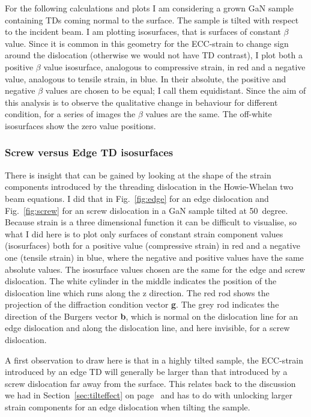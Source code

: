 For the following calculations and plots I am considering a \hkl[001] grown GaN sample containing TDs coming normal to the surface. The sample is tilted with respect to the incident beam. I am plotting isosurfaces, that is surfaces of constant $\beta$ value. Since it is common in this geometry for the ECC-strain to change sign around the dislocation (otherwise we would not have TD contrast), I plot both a positive $\beta$ value isosurface, analogous to compressive strain, in red and a negative value, analogous to tensile strain, in blue. In their absolute, the positive and negative $\beta$ values are chosen to be equal; I call them equidistant. Since the aim of this analysis is to observe the qualitative change in behaviour for different condition, for a series of images the $\beta$ values are the same. The off-white isosurfaces show the zero value positions. 


\subsubsection{Screw versus Edge TD isosurfaces}

There is insight that can be gained by looking at the shape of the strain components introduced by the threading dislocation in the Howie-Whelan two beam equations. I did that in Fig.~\ref{fig:edge} for an edge dislocation and   Fig.~\ref{fig:screw} for an screw dislocation in a GaN sample tilted at \SI{50}{degree}. Because strain is a three dimensional function it can be difficult to visualise, so what I did here is to plot only surfaces of constant strain component values (isosurfaces) both for a positive value (compressive strain) in red and a negative one (tensile strain) in blue, where the negative and positive values have the same absolute values. The isosurface values chosen are the same for the edge and screw dislocation.  The white cylinder in the middle indicates the position of the dislocation line which runs along the z direction. The red rod shows the projection of the diffraction condition vector \textbf{g}. The grey rod indicates the direction of the Burgers vector \textbf{b}, which is normal on the dislocation line for an edge dislocation and along the dislocation line, and here invisible, for a screw dislocation. 


A first observation to draw here is that in a highly tilted sample, the ECC-strain introduced by an edge TD will generally be larger than that introduced by a screw dislocation far away from the surface. This relates back to the discussion we had in Section~\ref{sec:tilteffect} on page~\pageref{sec:tilteffect} and has to do with unlocking larger strain components for an edge dislocation when tilting the sample. 



